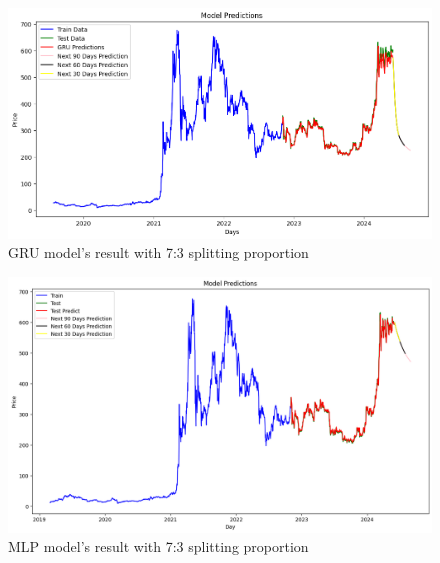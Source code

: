 \documentclass{ieeeojies}
\begin{document}
\begin{figure}[H]
  \centering
  \begin{minipage}{0.8\linewidth}
    \centering
    \includegraphics[width=\linewidth]{Image/GRU/GRU_BNN_73_n.png}
    \caption{GRU model's result with 7:3 splitting proportion}
    \label{fig:21}
  \end{minipage}
\end{figure}
\vspace{-10mm}
\begin{figure}[H]
  \centering
  \begin{minipage}{0.8\linewidth}
    \centering
    \includegraphics[width=\linewidth]{Image/MLP/MLP_BNB_7_3_new.png}
    \caption{MLP model's result with 7:3 splitting proportion}
    \label{fig:22}
  \end{minipage}
\end{figure}
\vspace{-3mm}
\end{document}
